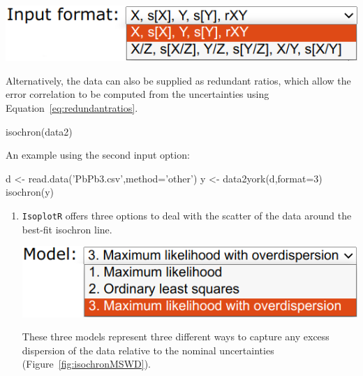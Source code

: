 \begin{refsection}
\noindent\begin{minipage}[t]{.45\linewidth}
  \strut\vspace*{-\baselineskip}\newline
  \includegraphics[width=\linewidth]{../figures/OtherRegressionInput.png}
\end{minipage}
\begin{minipage}[t]{.55\linewidth}
  Alternatively, the data can also be supplied as redundant ratios,
  which allow the error correlation to be computed from the
  uncertainties using Equation~\ref{eq:redundantratios}.
\end{minipage}

\begin{console}
isochron(data2)
\end{console}

An example using the second input option:

\begin{script}
d <- read.data('PbPb3.csv',method='other')
y <- data2york(d,format=3)
isochron(y)
\end{script}

\begin{enumerate}

\item \texttt{IsoplotR} offers three options to deal with the scatter of the
  data around the best-fit isochron line.

\noindent\begin{minipage}[t]{.45\linewidth}
\strut\vspace*{-\baselineskip}\newline
\includegraphics[width=\linewidth]{../figures/OtherRegressionModels.png}
\end{minipage}
\begin{minipage}[t]{.55\linewidth}
  These three models represent three different ways to capture any
  excess dispersion of the data relative to the nominal uncertainties
  (Figure~\ref{fig:isochronMSWD}).
\end{minipage}


\end{enumerate}
\end{refsection}
